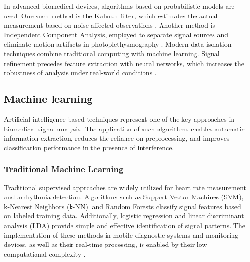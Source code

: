 \documentclass{citask}
\begin{document}
In advanced biomedical devices, algorithms based on probabilistic models are used. One such method is the Kalman filter, which estimates the actual measurement based on noise-affected observations \cite{8}. Another method is Independent Component Analysis, employed to separate signal sources and eliminate motion artifacts in photoplethysmography \cite{9}. Modern data isolation techniques combine traditional computing with machine learning. Signal refinement precedes feature extraction with neural networks, which increases the robustness of analysis under real-world conditions \cite{10}.
\subsection{Machine learning}
Artificial intelligence-based techniques represent one of the key approaches in biomedical signal analysis. The application of such algorithms enables automatic information extraction, reduces the reliance on preprocessing, and improves classification performance in the presence of interference.

\subsubsection{Traditional Machine Learning}
Traditional supervised approaches are widely utilized for heart rate measurement and arrhythmia detection. Algorithms such as Support Vector Machines (SVM), k-Nearest Neighbors (k-NN), and Random Forests classify signal features based on labeled training data. Additionally, logistic regression and linear discriminant analysis (LDA) provide simple and effective identification of signal patterns. The implementation of these methods in mobile diagnostic systems and monitoring devices, as well as their real-time processing, is enabled by their low computational complexity \cite{11}.
\end{document}
